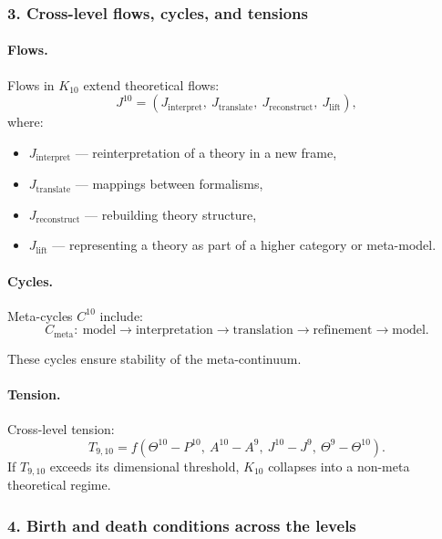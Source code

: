 \subsubsection{3. Cross-level flows, cycles, and tensions}

\paragraph{Flows.}
Flows in $K_{10}$ extend theoretical flows:
\[
J^{10} = (J_{\mathrm{interpret}},\ J_{\mathrm{translate}},\
         J_{\mathrm{reconstruct}},\ J_{\mathrm{lift}}),
\]
where:
\begin{itemize}
  \item $J_{\mathrm{interpret}}$ — reinterpretation of a theory in a new frame,
  \item $J_{\mathrm{translate}}$ — mappings between formalisms,
  \item $J_{\mathrm{reconstruct}}$ — rebuilding theory structure,
  \item $J_{\mathrm{lift}}$ — representing a theory as part of a higher
        category or meta-model.
\end{itemize}

\paragraph{Cycles.}
Meta-cycles $C^{10}$ include:
\[
C_{\mathrm{meta}}:\ 
\text{model} \rightarrow \text{interpretation} \rightarrow \text{translation}
\rightarrow \text{refinement} \rightarrow \text{model}.
\]

These cycles ensure stability of the meta-continuum.

\paragraph{Tension.}
Cross-level tension:
\[
T_{9,10} = 
f(\Theta^{10} - P^{10},\ A^{10} - A^9,\ 
  J^{10} - J^9,\ \Theta^9 - \Theta^{10}).
\]
If $T_{9,10}$ exceeds its dimensional threshold, $K_{10}$ collapses into a
non-meta theoretical regime.

\subsubsection{4. Birth and death conditions across the levels}

